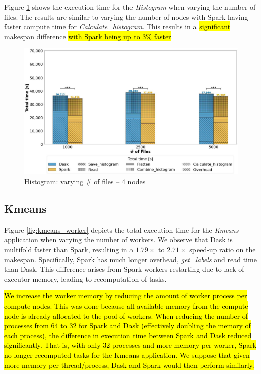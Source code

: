 \documentclass[AMA,STIX1COL]{WileyNJD-v2}
\newcommand{\HL}[1]{\hl{#1}}
\begin{document}
Figure \ref{fig:histogram_block} shows the execution time for the \textit{Histogram} when varying the number of files.
The results are similar to varying the number of nodes with Spark having faster compute time for \textit{Calculate\_histogram}.
This results in a \HL{significant} makespan difference \HL{with Spark being up to 3\% faster}.
\begin{figure}[!h]
	\centering
	\includegraphics[clip,width=0.75\columnwidth]{figures/stacked_histogram_block.jpg}
	\caption{Histogram: varying \# of files -- 4 nodes}
	\label{fig:histogram_block}
\end{figure}
						
\subsection{Kmeans}
Figure \ref{fig:kmeans_worker} depicts the total execution time for the \textit{Kmeans} application when varying the number of workers.
We observe that Dask is multifold faster than Spark, resulting in a $1.79\times$ to $2.71\times$ speed-up ratio on the makespan.
Specifically, Spark has much longer overhead, \textit{get\_labels} and read time than Dask.
This difference arises from Spark workers restarting due to lack of executor memory, leading to recomputation of tasks.

\HL{
	We increase the worker memory by reducing the amount of worker process per compute nodes.
	This was done because all available memory from the compute node is already allocated to the pool of workers.
	When reducing the number of processes from 64 to 32 for Spark and Dask 
	(effectively doubling the memory of each process), the difference in execution time between Spark and Dask reduced significantly.
	That is, with only 32 processes and more memory per worker, Spark no longer recomputed tasks for the Kmeans application.
	We suppose that given more memory per thread/process, Dask and Spark would then perform similarly.
}
\end{document}
